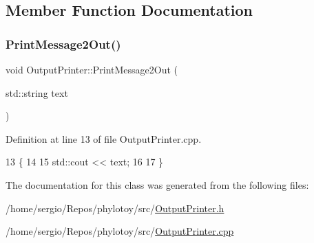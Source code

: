 \subsection{Member Function Documentation}
\mbox{\label{classOutputPrinter_ae9cd642df56fb6febef4cccff7ca12f2}} 
\subsubsection{\texorpdfstring{Print\+Message2\+Out()}{PrintMessage2Out()}}
{\footnotesize\ttfamily void Output\+Printer\+::\+Print\+Message2\+Out (\begin{DoxyParamCaption}\item[{std\+::string}]{text }\end{DoxyParamCaption})}



Definition at line 13 of file Output\+Printer.\+cpp.


\begin{DoxyCode}
13                                                    \{
14   
15   std::cout << text;
16   
17 \}
\end{DoxyCode}


The documentation for this class was generated from the following files\+:\begin{DoxyCompactItemize}
\item 
/home/sergio/\+Repos/phylotoy/src/\hyperlink{OutputPrinter_8h}{Output\+Printer.\+h}\item 
/home/sergio/\+Repos/phylotoy/src/\hyperlink{OutputPrinter_8cpp}{Output\+Printer.\+cpp}\end{DoxyCompactItemize}
